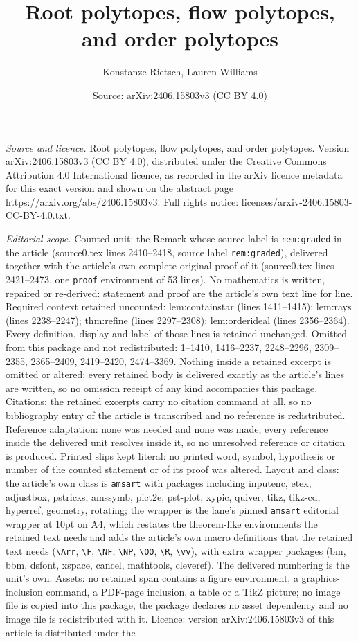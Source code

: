 \documentclass[10pt,a4paper]{amsart}
\title[Root polytopes, flow polytopes, and order polytopes]{Root polytopes, flow polytopes, and order polytopes}
\author{Konstanze Rietsch, Lauren Williams}
\date{Source: arXiv:2406.15803v3 (CC BY 4.0)}
\begin{document}
\maketitle

\noindent\emph{Source and licence.} Root polytopes, flow polytopes, and order polytopes. Version arXiv:2406.15803v3 (CC BY 4.0), distributed under the Creative Commons Attribution 4.0 International licence, as recorded in the arXiv licence metadata for this exact version and shown on the abstract page https://arxiv.org/abs/2406.15803v3. Full rights notice: licenses/arxiv-2406.15803-CC-BY-4.0.txt.\par\smallskip

\noindent\textit{Editorial scope.} Counted unit: the Remark whose source label is \texttt{rem:graded} in the article (source0.tex lines 2410--2418, source label \texttt{rem:graded}), delivered together with the article's own complete original proof of it (source0.tex lines 2421--2473, one \texttt{proof} environment of 53 lines). No mathematics is written, repaired or re-derived: statement and proof are the article's own text line for line. Required context retained uncounted: lem:containstar (lines 1411--1415); lem:rays (lines 2238--2247); thm:refine (lines 2297--2308); lem:orderideal (lines 2356--2364). Every definition, display and label of those lines is retained unchanged. Omitted from this package and not redistributed: 1--1410, 1416--2237, 2248--2296, 2309--2355, 2365--2409, 2419--2420, 2474--3369. Nothing inside a retained excerpt is omitted or altered: every retained body is delivered exactly as the article's lines are written, so no omission receipt of any kind accompanies this package. Citations: the retained excerpts carry no citation command at all, so no bibliography entry of the article is transcribed and no reference is redistributed. Reference adaptation: none was needed and none was made; every reference inside the delivered unit resolves inside it, so no unresolved reference or citation is produced. Printed slips kept literal: no printed word, symbol, hypothesis or number of the counted statement or of its proof was altered. Layout and class: the article's own class is \texttt{amsart} with packages including inputenc, etex, adjustbox, pstricks, amssymb, pict2e, pst-plot, xypic, quiver, tikz, tikz-cd, hyperref, geometry, rotating; the wrapper is the lane's pinned \texttt{amsart} editorial wrapper at 10pt on A4, which restates the theorem-like environments the retained text needs and adds the article's own macro definitions that the retained text needs (\texttt{\textbackslash Arr}, \texttt{\textbackslash F}, \texttt{\textbackslash NF}, \texttt{\textbackslash NP}, \texttt{\textbackslash OO}, \texttt{\textbackslash R}, \texttt{\textbackslash vv}), with extra wrapper packages (bm, bbm, dsfont, xspace, cancel, mathtools, cleveref). The delivered numbering is the unit's own. Assets: no retained span contains a figure environment, a graphics-inclusion command, a PDF-page inclusion, a table or a TikZ picture; no image file is copied into this package, the package declares no asset dependency and no image file is redistributed with it. Licence: version arXiv:2406.15803v3 of this article is distributed under the 
\end{document}
